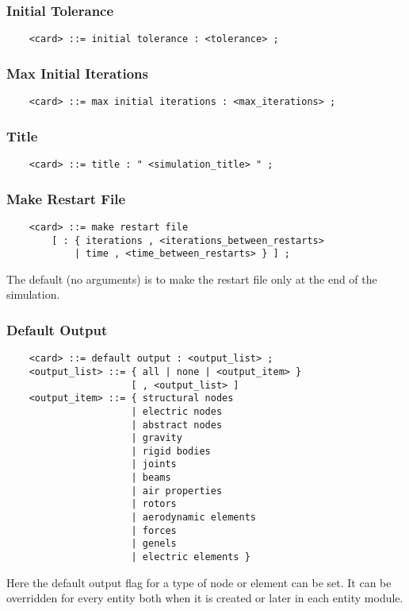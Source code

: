 \subsubsection{Initial Tolerance}
\begin{verbatim}
    <card> ::= initial tolerance : <tolerance> ;
\end{verbatim}

\subsubsection{Max Initial Iterations}
\begin{verbatim}
    <card> ::= max initial iterations : <max_iterations> ;
\end{verbatim}

\subsubsection{Title}
\begin{verbatim}
    <card> ::= title : " <simulation_title> " ;
\end{verbatim}

\subsubsection{Make Restart File}
\begin{verbatim}
    <card> ::= make restart file
        [ : { iterations , <iterations_between_restarts>
            | time , <time_between_restarts> } ] ;
\end{verbatim}
The default (no arguments) is to make the restart file only at the end of
the simulation.

\subsubsection{Default Output}
\begin{verbatim}
    <card> ::= default output : <output_list> ;
    <output_list> ::= { all | none | <output_item> } 
                      [ , <output_list> ]
    <output_item> ::= { structural nodes
                      | electric nodes
                      | abstract nodes
                      | gravity
                      | rigid bodies
                      | joints
                      | beams
                      | air properties
                      | rotors
                      | aerodynamic elements
                      | forces
                      | genels
                      | electric elements }
\end{verbatim}
Here the default output flag for a type of node or element can be set. It
can be overridden for every entity both when it is created or later in
each entity module.

